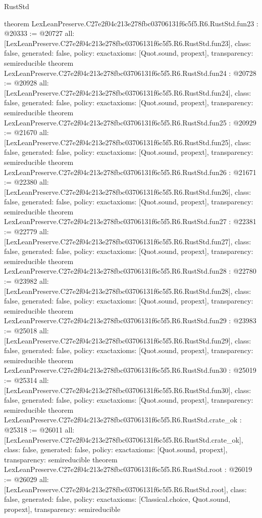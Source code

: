 \begin{lexlean}{RustStd}
\begin{coremodule}
{}
theorem LexLeanPreserve.C27e2f04c213e278fbc03706131f6c5f5.R6.RustStd.fun23 : @20333 := @20727 {
  all: [LexLeanPreserve.C27e2f04c213e278fbc03706131f6c5f5.R6.RustStd.fun23],
  class: false,
  generated: false,
  policy: exact{axioms: [Quot.sound, propext]},
  transparency: semireducible
}
theorem LexLeanPreserve.C27e2f04c213e278fbc03706131f6c5f5.R6.RustStd.fun24 : @20728 := @20928 {
  all: [LexLeanPreserve.C27e2f04c213e278fbc03706131f6c5f5.R6.RustStd.fun24],
  class: false,
  generated: false,
  policy: exact{axioms: [Quot.sound, propext]},
  transparency: semireducible
}
theorem LexLeanPreserve.C27e2f04c213e278fbc03706131f6c5f5.R6.RustStd.fun25 : @20929 := @21670 {
  all: [LexLeanPreserve.C27e2f04c213e278fbc03706131f6c5f5.R6.RustStd.fun25],
  class: false,
  generated: false,
  policy: exact{axioms: [Quot.sound, propext]},
  transparency: semireducible
}
theorem LexLeanPreserve.C27e2f04c213e278fbc03706131f6c5f5.R6.RustStd.fun26 : @21671 := @22380 {
  all: [LexLeanPreserve.C27e2f04c213e278fbc03706131f6c5f5.R6.RustStd.fun26],
  class: false,
  generated: false,
  policy: exact{axioms: [Quot.sound, propext]},
  transparency: semireducible
}
theorem LexLeanPreserve.C27e2f04c213e278fbc03706131f6c5f5.R6.RustStd.fun27 : @22381 := @22779 {
  all: [LexLeanPreserve.C27e2f04c213e278fbc03706131f6c5f5.R6.RustStd.fun27],
  class: false,
  generated: false,
  policy: exact{axioms: [Quot.sound, propext]},
  transparency: semireducible
}
theorem LexLeanPreserve.C27e2f04c213e278fbc03706131f6c5f5.R6.RustStd.fun28 : @22780 := @23982 {
  all: [LexLeanPreserve.C27e2f04c213e278fbc03706131f6c5f5.R6.RustStd.fun28],
  class: false,
  generated: false,
  policy: exact{axioms: [Quot.sound, propext]},
  transparency: semireducible
}
theorem LexLeanPreserve.C27e2f04c213e278fbc03706131f6c5f5.R6.RustStd.fun29 : @23983 := @25018 {
  all: [LexLeanPreserve.C27e2f04c213e278fbc03706131f6c5f5.R6.RustStd.fun29],
  class: false,
  generated: false,
  policy: exact{axioms: [Quot.sound, propext]},
  transparency: semireducible
}
theorem LexLeanPreserve.C27e2f04c213e278fbc03706131f6c5f5.R6.RustStd.fun30 : @25019 := @25314 {
  all: [LexLeanPreserve.C27e2f04c213e278fbc03706131f6c5f5.R6.RustStd.fun30],
  class: false,
  generated: false,
  policy: exact{axioms: [Quot.sound, propext]},
  transparency: semireducible
}
theorem LexLeanPreserve.C27e2f04c213e278fbc03706131f6c5f5.R6.RustStd.crate_ok : @25318 := @26011 {
  all: [LexLeanPreserve.C27e2f04c213e278fbc03706131f6c5f5.R6.RustStd.crate_ok],
  class: false,
  generated: false,
  policy: exact{axioms: [Quot.sound, propext]},
  transparency: semireducible
}
theorem LexLeanPreserve.C27e2f04c213e278fbc03706131f6c5f5.R6.RustStd.root : @26019 := @26029 {
  all: [LexLeanPreserve.C27e2f04c213e278fbc03706131f6c5f5.R6.RustStd.root],
  class: false,
  generated: false,
  policy: exact{axioms: [Classical.choice, Quot.sound, propext]},
  transparency: semireducible
}


\end{coremodule}
\end{lexlean}
